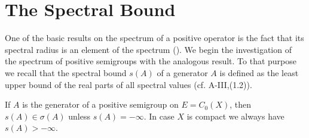 \section{The Spectral Bound}\label{sec:b3-1}
One of the basic results on the spectrum of a positive operator is the fact that its spectral radius is an element of the spectrum (\citet[V.Prop.4.1]{schaefer:1974}).
We begin the investigation of the spectrum of positive semigroups with the analogous result.
To that purpose we recall that the spectral bound $s(A)$ of a generator $A$ is defined as the least upper bound of the real parts of all spectral values (cf. A-III,(1.2)).
\begin{theorem}\label{thm:b3-1.1}
If $A$ is the generator of a positive semigroup on $E = C_{0}(X)$, then $s(A) \in \sigma(A)$ unless 
$s(A) = -\infty$.
In case $X$ is compact we always have $s(A) > -\infty$.
\end{theorem}
